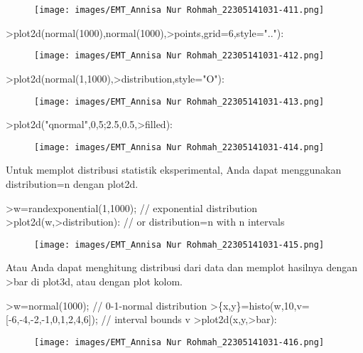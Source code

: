 \documentclass[a4paper,10pt]{article}
\begin{document}
\begin{eulernotebook}
\begin{figure}[h]
    \centering
    \texttt{[image: images/EMT\_Annisa Nur Rohmah\_22305141031-411.png]}
\end{figure}
\begin{eulerprompt}
>plot2d(normal(1000),normal(1000),>points,grid=6,style=".."):
\end{eulerprompt}
\begin{figure}[h]
    \centering
    \texttt{[image: images/EMT\_Annisa Nur Rohmah\_22305141031-412.png]}
\end{figure}
\begin{eulerprompt}
>plot2d(normal(1,1000),>distribution,style="O"):
\end{eulerprompt}
\begin{figure}[h]
    \centering
    \texttt{[image: images/EMT\_Annisa Nur Rohmah\_22305141031-413.png]}
\end{figure}
\begin{eulerprompt}
>plot2d("qnormal",0,5;2.5,0.5,>filled):
\end{eulerprompt}
\begin{figure}[h]
    \centering
    \texttt{[image: images/EMT\_Annisa Nur Rohmah\_22305141031-414.png]}
\end{figure}
\begin{eulercomment}
Untuk memplot distribusi statistik eksperimental, Anda dapat
menggunakan distribution=n dengan plot2d.
\end{eulercomment}
\begin{eulerprompt}
>w=randexponential(1,1000); // exponential distribution
>plot2d(w,>distribution): // or distribution=n with n intervals
\end{eulerprompt}
\begin{figure}[h]
    \centering
    \texttt{[image: images/EMT\_Annisa Nur Rohmah\_22305141031-415.png]}
\end{figure}
\begin{eulercomment}
Atau Anda dapat menghitung distribusi dari data dan memplot hasilnya
dengan \textgreater{}bar di plot3d, atau dengan plot kolom.
\end{eulercomment}
\begin{eulerprompt}
>w=normal(1000); // 0-1-normal distribution
>\{x,y\}=histo(w,10,v=[-6,-4,-2,-1,0,1,2,4,6]); // interval bounds v
>plot2d(x,y,>bar):
\end{eulerprompt}
\begin{figure}[h]
    \centering
    \texttt{[image: images/EMT\_Annisa Nur Rohmah\_22305141031-416.png]}
\end{figure}

\end{eulernotebook}
\end{document}
